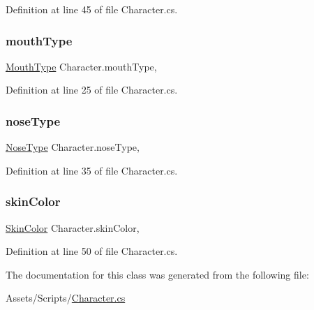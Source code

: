 Definition at line 45 of file Character.\+cs.

\mbox{\label{class_character_a4199c2476940533add49ababfc7cba52}} 
\subsubsection{\texorpdfstring{mouthType}{mouthType}}
{\footnotesize\ttfamily \mbox{\hyperlink{class_character_aaefb65409260b3ad1511951aab1ddd6c}{Mouth\+Type}} Character.\+mouth\+Type\hspace{0.3cm}{\ttfamily [get]}, {\ttfamily [set]}}



Definition at line 25 of file Character.\+cs.

\mbox{\label{class_character_a451957556cb1b0aaa89b9dcf36b2b1dd}} 
\subsubsection{\texorpdfstring{noseType}{noseType}}
{\footnotesize\ttfamily \mbox{\hyperlink{class_character_a638a71f8525dc3a59596f7f4a7836036}{Nose\+Type}} Character.\+nose\+Type\hspace{0.3cm}{\ttfamily [get]}, {\ttfamily [set]}}



Definition at line 35 of file Character.\+cs.

\mbox{\label{class_character_af3528fb3651c738431375d8c39b4651c}} 
\subsubsection{\texorpdfstring{skinColor}{skinColor}}
{\footnotesize\ttfamily \mbox{\hyperlink{class_character_a726214a0fe480fffada7772697764824}{Skin\+Color}} Character.\+skin\+Color\hspace{0.3cm}{\ttfamily [get]}, {\ttfamily [set]}}



Definition at line 50 of file Character.\+cs.



The documentation for this class was generated from the following file\+:\begin{DoxyCompactItemize}
\item 
Assets/\+Scripts/\mbox{\hyperlink{_character_8cs}{Character.\+cs}}\end{DoxyCompactItemize}
